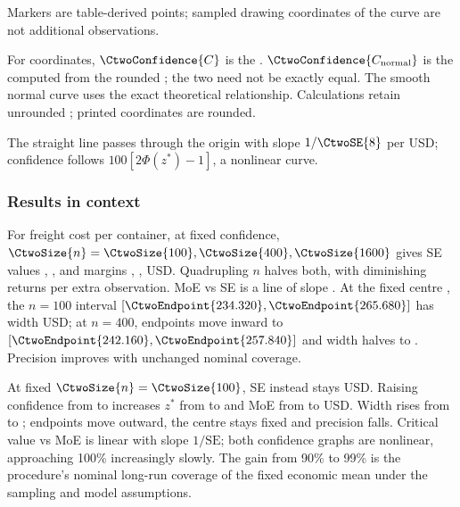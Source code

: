 \begin{landscape}
\begin{minipage}{\linewidth}
\begin{minipage}[t]{.43\linewidth}
Markers are table-derived points; sampled drawing coordinates of the curve are not additional observations.

For  coordinates, $\CtwoConfidence{C}$ is the . $\CtwoConfidence{C_{\rm normal}}$ is the  computed from the rounded ; the two need not be exactly equal. The smooth normal curve uses the exact theoretical relationship. Calculations retain unrounded ; printed coordinates are rounded.
\end{minipage}
\end{minipage}
\par\medskip

The straight line passes through the origin with slope $1/\CtwoSE{8}$ per USD; confidence follows $100[2\Phi(z^*)-1]$, a nonlinear curve.

\end{landscape}
\clearpage
{}
\subsubsection*{Results in context}
For freight cost per container, at fixed  confidence, $\CtwoSize{n}=\CtwoSize{100},\CtwoSize{400},\CtwoSize{1600}$ gives SE values , ,  and margins , ,  USD. Quadrupling $n$ halves both, with diminishing returns per extra observation. MoE vs SE is a line of slope . At the fixed centre , the $n=100$ interval $[\CtwoEndpoint{234.320},\CtwoEndpoint{265.680}]$ has width  USD; at $n=400$, endpoints move inward to $[\CtwoEndpoint{242.160},\CtwoEndpoint{257.840}]$ and width halves to . Precision improves with unchanged nominal coverage.

At fixed $\CtwoSize{n}=\CtwoSize{100}$, SE instead stays  USD. Raising confidence from  to  increases $z^*$ from  to  and MoE from  to  USD. Width rises from  to ; endpoints move outward, the centre stays fixed and precision falls. Critical value vs MoE is linear with slope $1/\mathrm{SE}$; both confidence graphs are nonlinear, approaching 100\% increasingly slowly. The gain from 90\% to 99\% is the procedure's nominal long-run coverage of the fixed economic mean under the sampling and model assumptions.
\clearpage


